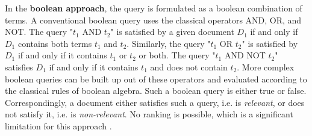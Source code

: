 
In the \textbf{boolean approach}, the query is formulated as a boolean combination of terms. A conventional boolean query uses the classical operators AND, OR, and NOT. The query "$t_1$ AND $t_2$" is satisfied by a given document $D_1$ if and only if $D_1$ contains both terms $t_1$ and $t_2$. Similarly, the query "$t_1$ OR $t_2$" is satisfied by $D_1$ if and only if it contains $t_1$ or $t_2$ or both. The query "$t_1$ AND NOT $t_2$" satisfies $D_1$ if and only if it contains $t_1$ and does not contain $t_2$. More complex boolean queries can be built up out of these operators and evaluated according to the classical rules of boolean algebra. Such a boolean query is either true or false. Correspondingly, a document either satisfies such a query, i.e. is \textit{relevant}, or does not satisfy it, i.e. is \textit{non-relevant}. No ranking is possible, which is a significant limitation for this approach \citep{harmon1995}. 

